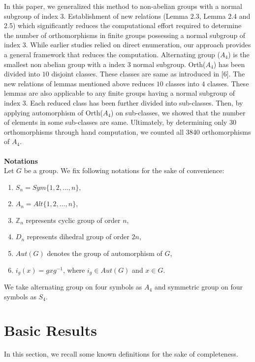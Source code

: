 \documentclass[11pt,a4paper]{article}
\theoremstyle{definition}
\theoremstyle{remark}
\begin{document}
  In this paper, we generalized this method to non-abelian groups with a normal subgroup of index 3.
 Establishment of new relations (Lemma 2.3, Lemma 2.4 and 2.5) which significantly reduces the computational effort required to determine the number of orthomorphisms in finite groups possessing a normal subgroup of index $3$. While earlier studies relied on direct enumeration, our approach provides a general framework that reduces the computation.  Alternating group ($A_4$) is the smallest non abelian group with a index $3$ normal subgroup. Orth($A_4$) has been divided into $10$ disjoint classes. These classes are same as introduced in [6]. The new relations of lemmas mentioned above reduces $10$ classes into $4$ classes. These lemmas are also applicable to any finite groups having a normal subgroup of index $3$.  Each reduced class has been further divided into sub-classes. Then, by applying automorphism of Orth($A_4$) on sub-classes, we showed that the number of elements in some sub-classes are same. Ultimately, by determining only $30$ orthomorphisms through hand computation, we counted all 3840 orthomorphisms of $A_4$. 
   \\ \\
	\textbf{Notations} \\
	Let $G$ be a group. We fix following notations for the sake of convenience:
	\begin{enumerate}
		\item [(i)] $S_{n} = Sym\{1,2,\ldots,n\}$,
		\item [(ii)] $A_{n} = Alt\{1,2,\ldots,n\}$,
		\item [(iii)] $\mathbb{Z}_{n}$ represents cyclic group of order $n$,
		\item [(iv)]  $D_{n}$ represents dihedral group of order $2n$,
		\item [(v)] $Aut(G)$ denotes the group of automorphism of $G$, 
		\item [(vi)] $i_{g}(x) = gxg^{-1}$, where $i_{g} \in Aut(G)$ and $x \in G$.
	\end{enumerate}
	 We take alternating group on four symbols as $A_{4}$ and symmetric group on four symbols as $S_{4}$.
	
	
	
	\section{Basic Results}
	In this section, we recall some known definitions for the sake of completeness.
	
\end{document}
